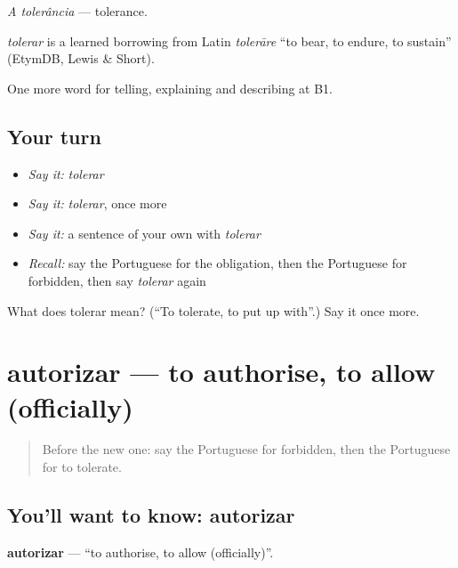 \emph{A tolerância} — tolerance.

\begin{cousinweb}
\emph{tolerar} is a learned borrowing from Latin \emph{tolerāre} \textquotedblleft{}to bear, to endure, to sustain\textquotedblright{} (EtymDB, Lewis \& Short).
\end{cousinweb}

\begin{grammarlens}[title={What you've built}]
One more word for telling, explaining and describing at B1.
\end{grammarlens}

\subsection*{Your turn}
\begin{itemize}
\raggedright
  \item \emph{Say it:} \emph{tolerar}
  \item \emph{Say it:} \emph{tolerar}, once more
  \item \emph{Say it:} a sentence of your own with \emph{tolerar}
  \item \emph{Recall:} say the Portuguese for the obligation, then the Portuguese for forbidden, then say \emph{tolerar} again
\end{itemize}

\begin{tcolorbox}[breakable,colback=teal!4,colframe=teal!35!black,title={Before you move on}]
What does tolerar mean? (\textquotedblleft{}To tolerate, to put up with\textquotedblright{}.) Say it once more.
\end{tcolorbox}
\section[autorizar]{autorizar — to authorise, to allow (officially)}

\label{lesson:PT-C382-autorizar}



\begin{quote}
Before the new one: say the Portuguese for forbidden, then the Portuguese for to tolerate.
\end{quote}

\subsection*{You'll want to know: autorizar}
\textbf{autorizar} — \textquotedblleft{}to authorise, to allow (officially)\textquotedblright{}.

